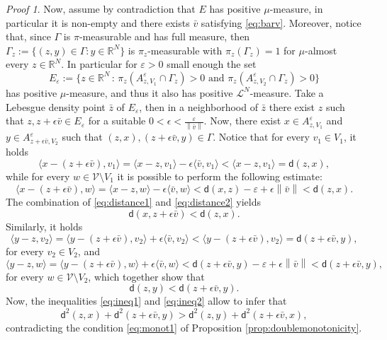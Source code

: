 \documentclass[11pt,twoside,a4paper]{article}
\newcommand{\scal}[2]{\ensuremath{\langle #1 , #2 \rangle}} %
\newcommand{\norm}[1]{\left\lVert#1\right\rVert}
\newcommand{\Leb}{\mathscr{L}}
\newcommand{\R}{\mathbb{R}}
\newcommand{\suchthat}{\ensuremath{\,:\,}} %
\newcommand{\thmsymbol}{\( \square \)}
\newcommand{\di}{\mathsf d} %
\theoremstyle{theorem}
\theoremstyle{definition}
\theoremstyle{remark}
\theoremstyle{proof}
\newtheorem*{pro}{Proof}
\newenvironment{pr}{\begin{pro}%
 \renewcommand{\qedsymbol}{\thmsymbol}\pushQED{\qed}}%
 {\popQED\end{pro}}
\begin{document}
\begin{pr}
Now, assume by contradiction that $E$ has positive $\mu$-measure, in particular it is non-empty and there exists $\bar v$ satisfying \eqref{eq:barv}. Moreover, notice that, since $\Gamma$ is $\pi$-measurable and has full measure, then $\Gamma_z:=\{(z,y)\in \Gamma : y\in \R^N\}$ is $\pi_z$-measurable with $\pi_z(\Gamma_z)=1$ for $\mu$-almost every $z\in \R^N$. In particular for $\varepsilon>0$ small enough the set
\begin{equation*}
    E_\varepsilon:= \big\{z\in \R^N \suchthat \pi_z(A_{z,V_1}^\varepsilon \cap \Gamma_z)>0 \text{ and } \pi_z(A_{z,V_2}^\varepsilon \cap \Gamma_z)>0 \big\}
\end{equation*}
has positive $\mu$-measure, and thus it also has positive $\Leb^N$-measure. Take a Lebesgue density point $\bar z$ of $E_\varepsilon$, then in a neighborhood of $\bar z$ there exist $z$ such that $z,z+\epsilon\bar v \in E_\varepsilon$ for a suitable $0<\epsilon<\frac{ \varepsilon}{ \norm{\bar v}}$. Now, there exist $x\in A_{z,V_1}^\varepsilon$ and $y\in A_{z+\epsilon \bar v,V_2}^\varepsilon$ such that $(z,x),(z+\epsilon\bar v,y) \in \Gamma$. Notice that for every $v_1\in V_1$, it holds
\begin{equation}\label{eq:distance1}
    \scal{x - (z + \epsilon \bar v)}{v_1} = \scal{x-z}{v_1} -\epsilon \scal{\bar v}{v_1} < \scal{x-z}{v_1} = \di(z,x) ,
\end{equation}
while for every $w\in \mathcal V \setminus  V_1$ it is possible to perform the following estimate:
\begin{equation}\label{eq:distance2}
    \scal{x - (z + \epsilon \bar v)}{w} = \scal{x-z}{w} -\epsilon \scal{\bar v}{w}< \di (x,z) - \varepsilon + \epsilon \norm{\bar v} < \di (z,x).
\end{equation}
The combination of \eqref{eq:distance1} and \eqref{eq:distance2} yields 
\begin{equation}\label{eq:ineq1}
    \di(x,z+\epsilon \bar v) < \di (z,x).
\end{equation}
Similarly, it holds 
\begin{equation*}
    \scal{y-z}{v_2} = \scal{y-(z+\epsilon\bar v)}{v_2} +\epsilon \scal{\bar v}{v_2} < \scal{y-(z+\epsilon\bar v)}{v_2} = \di (z + \epsilon \bar v,y) ,
\end{equation*}
for every $v_2\in V_2$, and 
\begin{equation*}
    \scal{y-z}{w} = \scal{y- (z+\epsilon \bar v)}{w} + \epsilon \scal{\bar v}{w}< \di (z + \epsilon \bar v,y) - \varepsilon + \epsilon \norm{\bar v} < \di (z + \epsilon \bar v,y),
\end{equation*}
for every $w \in \mathcal V \setminus V_2$, which together show that 
\begin{equation}\label{eq:ineq2}
      \di (z,y)<\di(z+\epsilon \bar v,y).
\end{equation}
Now, the inequalities \eqref{eq:ineq1} and \eqref{eq:ineq2} allow to infer that
\begin{equation*}
    \di^2 (z,x) + \di^2(z+\epsilon\bar v, y) > \di^2 (z,y) + \di^2 (z+\epsilon\bar v, x),
\end{equation*}
contradicting the condition \eqref{eq:monot1} of Proposition \ref{prop:doublemonotonicity}.



\end{pr}
\end{document}
